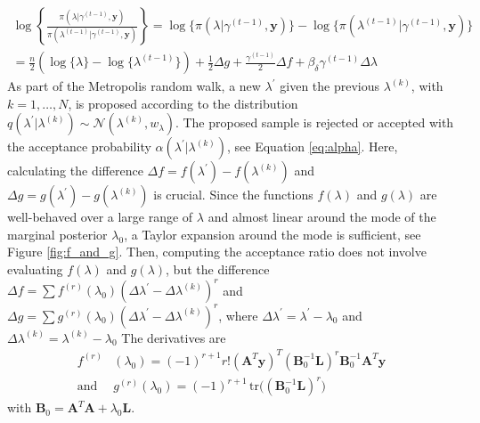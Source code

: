 \begin{align} 
	\log \left\{ \frac{\pi(\lambda | \gamma^{(t-1)}, \bm{y})  }{\pi(\lambda^{(t-1)}| \gamma^{(t-1)}, \bm{y})}  \right\} 
	= \log  \{\pi(\lambda | \gamma^{(t-1)}, \bm{y} ) \}  -\log  \{ \pi(\lambda^{(t-1)}| \gamma^{(t-1)}, \bm{y}) \} \\
	= \frac{n}{2} (\log\{\lambda\} - \log\{\lambda^{(t-1)}\} ) + \frac{1}{2} \Delta g + \frac{\gamma^{(t-1)}}{2} \Delta f  + \beta_\delta \gamma^{(t-1)} \Delta \lambda  
\end{align}
As part of the Metropolis random walk, a new $\lambda^\prime$ given the previous $\lambda^{(k)}$, with $k = 1 , \dots, N$, is proposed according to the distribution $q(\lambda^\prime|\lambda^{(k)}) \sim \mathcal{N}(\lambda^{(k)}, w_\lambda)$.
The proposed sample is rejected or accepted with the acceptance probability $\alpha(\lambda^\prime |\lambda^{(k)})$, see Equation \eqref{eq:alpha}.
Here, calculating the difference $\Delta f = f(\lambda^\prime) - f(\lambda^{(k)})$ and $\Delta g = g(\lambda^\prime) - g(\lambda^{(k)})$ is crucial.
Since the functions $f(\lambda)$ and $g(\lambda)$ are well-behaved over a large range of $\lambda$ and almost linear around the mode of the marginal posterior $\lambda_0$, a Taylor expansion around the mode is sufficient, see Figure \ref{fig:f_and_g}.
Then, computing the acceptance ratio does not involve evaluating $f(\lambda)$ and $g(\lambda)$, but the difference $\Delta f = \sum f^{(r)}(\lambda_0) (\Delta \lambda^\prime - \Delta \lambda^{(k)})^r$ and $\Delta g = \sum g^{(r)}(\lambda_0) (\Delta \lambda^\prime - \Delta \lambda^{(k)})^{r}$, where $\Delta \lambda^\prime = \lambda^\prime - \lambda_0 $ and $\Delta \lambda^{(k)} =  \lambda^{(k)} - \lambda_0$
The derivatives are
\begin{align}
	f^{(r)}& (\lambda_0)= (-1)^{r+1} r! (\bm{A}^T \bm{y})^T (\bm{B}_0^{-1} \bm{L})^r \bm{B}_0^{-1} \bm{A}^T \bm{y} \label{eq:ftay}  \\
	\text{and } &g^{(r)} ( \lambda_0) = (-1)^{r+1} \, \text{tr} \big( (\bm{B}_0^{-1}\bm{ L })^r \big)
	\label{eq:gtay}
\end{align} 
with $\bm{B}_0 = \bm{A}^T  \bm{A} + \lambda_0 \bm{L}$.

